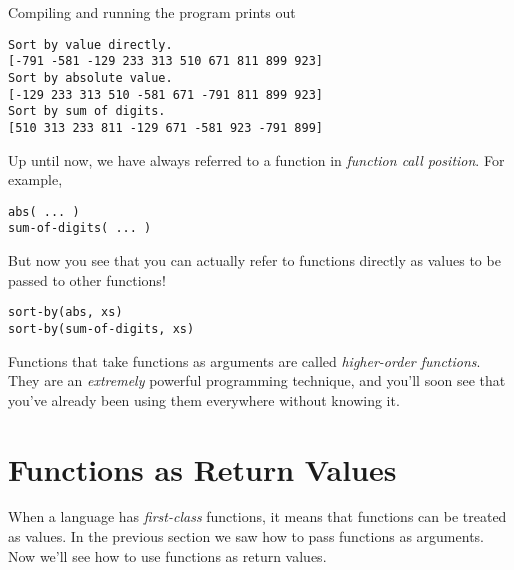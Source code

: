 \documentclass[10pt,oneside]{book}
\begin{document}
Compiling and running the program prints out
\begin{lstlisting}
Sort by value directly.
[-791 -581 -129 233 313 510 671 811 899 923]
Sort by absolute value.
[-129 233 313 510 -581 671 -791 811 899 923]
Sort by sum of digits.
[510 313 233 811 -129 671 -581 923 -791 899]
\end{lstlisting} 

Up until now, we have always referred to a function in {\em function call position}. For example,
\begin{lstlisting}
abs( ... )
sum-of-digits( ... )
\end{lstlisting}
But now you see that you can actually refer to functions directly as values to be passed to other functions!
\begin{lstlisting}
sort-by(abs, xs)
sort-by(sum-of-digits, xs)
\end{lstlisting}

Functions that take functions as arguments are called {\em higher-order functions}. They are an {\em extremely} powerful programming technique, and you'll soon see that you've already been using them everywhere without knowing it. 

\section{Functions as Return Values}
When a language has {\em first-class} functions, it means that functions can be treated as values. In the previous section we saw how to pass functions as arguments. Now we'll see how to use functions as return values.
\end{document}
